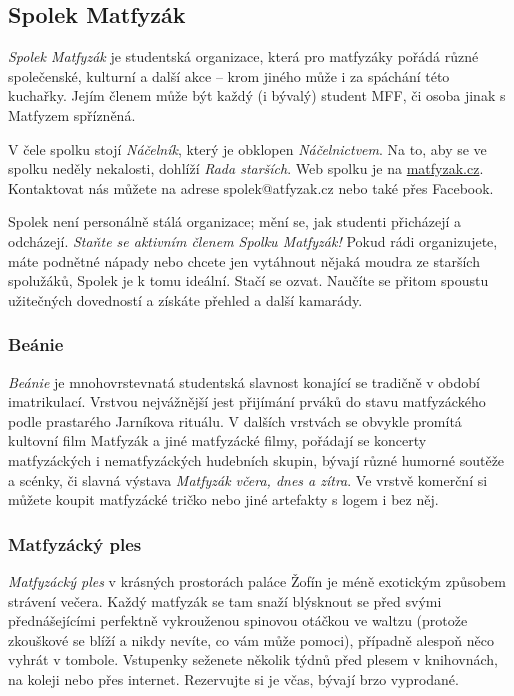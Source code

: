 \subsection{Spolek Matfyzák}


\textit{Spolek Matfyzák} je studentská organizace, která pro matfyzáky pořádá
různé společenské, kulturní a další akce – krom jiného může i za spáchání této
kuchařky. Jejím členem může být každý (i bývalý) student MFF, či osoba jinak s
Matfyzem spřízněná.

V čele spolku stojí \textit{Náčelník}, který je obklopen \textit{Náčelnictvem}.
Na to, aby se ve spolku neděly nekalosti, dohlíží \textit{Rada starších}. Web
spolku je na \url{matfyzak.cz}. Kontaktovat nás můžete na adrese
spolek@atfyzak.cz nebo také přes Facebook.

Spolek není personálně stálá organizace; mění se, jak studenti přicházejí a
odcházejí. \textit{Staňte se aktivním členem Spolku Matfyzák!} Pokud rádi
organizujete, máte podnětné nápady nebo chcete jen vytáhnout nějaká moudra ze
starších spolužáků, Spolek je k tomu ideální. Stačí se ozvat. Naučíte se přitom
spoustu užitečných dovedností a získáte přehled a další kamarády.


\subsubsection{Beánie}
\textit{Beánie} je mnohovrstevnatá studentská slavnost konající se tradičně v
období imatrikulací. Vrstvou nejvážnější jest přijímání prváků do stavu
matfyzáckého podle prastarého Jarníkova rituálu. V dalších vrstvách se obvykle
promítá kultovní film Matfyzák a jiné matfyzácké filmy, pořádají se koncerty
matfyzáckých i nematfyzáckých hudebních skupin, bývají různé humorné soutěže a
scénky, či slavná výstava \textit{Matfyzák včera, dnes a zítra}. Ve vrstvě
komerční si můžete koupit matfyzácké tričko nebo jiné artefakty s logem i bez
něj.


\subsubsection{Matfyzácký ples}
\textit{Matfyzácký ples} v krásných prostorách paláce Žofín je méně exotickým
způsobem strávení večera. Každý matfyzák se tam snaží blýsknout se před svými
přednášejícími perfektně vykrouženou spinovou otáčkou ve waltzu (protože
zkouškové se blíží a nikdy nevíte, co vám může pomoci), případně alespoň něco
vyhrát v tombole. Vstupenky seženete několik týdnů před plesem v knihovnách, na
koleji nebo přes internet. Rezervujte si je včas, bývají brzo vyprodané.


